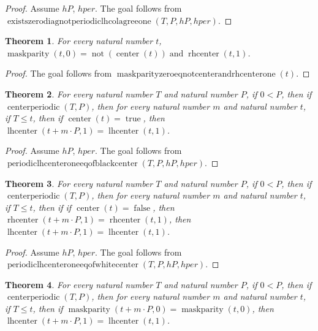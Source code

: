 \documentclass[11pt]{article}
\newtheorem{theorem}{Theorem}[section]
\theoremstyle{definition}
\begin{document}
\begin{proof}
Assume \(hP\), \(hper\).
The goal follows from \(\operatorname{existszerodiagnotperiodiclhcolagreeone}(T, P, hP, hper)\).
\end{proof}
\begin{theorem}
\label{ll:paper:maskparity-zero-eq-not-center-and-rhcenter-one}
For every natural number \(t\), \(\operatorname{maskparity}(t, 0) = \operatorname{not}(\operatorname{center}(t)) \operatorname{and} \operatorname{rhcenter}(t, 1)\).
\end{theorem}
\begin{proof}
The goal follows from \(\operatorname{maskparityzeroeqnotcenterandrhcenterone}(t)\).
\end{proof}
\begin{theorem}
\label{ll:paper:periodic-lhcenter-one-eq-of-black-center}
For every natural number \(T\) and natural number \(P\), if \(0 < P\), then if \(\operatorname{centerperiodic}(T, P)\), then for every natural number \(m\) and natural number \(t\), if \(T \le t\), then if \(\operatorname{center}(t) = \operatorname{true}\), then \(\operatorname{lhcenter}(t + m \cdot P, 1) = \operatorname{lhcenter}(t, 1)\).
\end{theorem}
\begin{proof}
Assume \(hP\), \(hper\).
The goal follows from \(\operatorname{periodiclhcenteroneeqofblackcenter}(T, P, hP, hper)\).
\end{proof}
\begin{theorem}
\label{ll:paper:periodic-lhcenter-one-eq-of-white-center}
For every natural number \(T\) and natural number \(P\), if \(0 < P\), then if \(\operatorname{centerperiodic}(T, P)\), then for every natural number \(m\) and natural number \(t\), if \(T \le t\), then if if \(\operatorname{center}(t) = \operatorname{false}\), then \(\operatorname{rhcenter}(t + m \cdot P, 1) = \operatorname{rhcenter}(t, 1)\), then \(\operatorname{lhcenter}(t + m \cdot P, 1) = \operatorname{lhcenter}(t, 1)\).
\end{theorem}
\begin{proof}
Assume \(hP\), \(hper\).
The goal follows from \(\operatorname{periodiclhcenteroneeqofwhitecenter}(T, P, hP, hper)\).
\end{proof}
\begin{theorem}
\label{ll:paper:periodic-lhcenter-one-eq-of-maskparity-zero-eq}
For every natural number \(T\) and natural number \(P\), if \(0 < P\), then if \(\operatorname{centerperiodic}(T, P)\), then for every natural number \(m\) and natural number \(t\), if \(T \le t\), then if \(\operatorname{maskparity}(t + m \cdot P, 0) = \operatorname{maskparity}(t, 0)\), then \(\operatorname{lhcenter}(t + m \cdot P, 1) = \operatorname{lhcenter}(t, 1)\).
\end{theorem}
\end{document}
